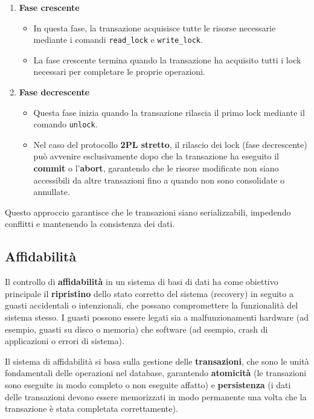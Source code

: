 \begin{enumerate}
    \item \textbf{Fase crescente}
    \begin{itemize}
        \item In questa fase, la transazione acquisisce tutte le risorse necessarie mediante i comandi \texttt{read\_lock} e \texttt{write\_lock}.
        \item La fase crescente termina quando la transazione ha acquisito tutti i lock necessari per completare le proprie operazioni.
    \end{itemize}
    \item \textbf{Fase decrescente}
    \begin{itemize}
        \item Questa fase inizia quando la transazione rilascia il primo lock mediante il comando \texttt{unlock}.
        \item Nel caso del protocollo \textbf{2PL stretto}, il rilascio dei lock (fase decrescente) può avvenire esclusivamente dopo che la transazione ha eseguito il \textbf{commit} o l'\textbf{abort}, garantendo che le risorse modificate non siano accessibili da altre transazioni fino a quando non sono consolidate o annullate.
    \end{itemize}
\end{enumerate}

Questo approccio garantisce che le transazioni siano serializzabili, impedendo conflitti e mantenendo la consistenza dei dati.

\subsection{Affidabilità}

Il controllo di \textbf{affidabilità} in un sistema di basi di dati ha come obiettivo principale il \textbf{ripristino} dello stato corretto del sistema (recovery) in seguito a guasti accidentali o intenzionali, che possano compromettere la funzionalità del sistema stesso. I guasti possono essere legati sia a malfunzionamenti hardware (ad esempio, guasti su disco o memoria) che software (ad esempio, crash di applicazioni o errori di sistema).

Il sistema di affidabilità si basa sulla gestione delle \textbf{transazioni}, che sono le unità fondamentali delle operazioni nel database, garantendo \textbf{atomicità} (le transazioni sono eseguite in modo completo o non eseguite affatto) e \textbf{persistenza} (i dati delle transazioni devono essere memorizzati in modo permanente una volta che la transazione è stata completata correttamente).

